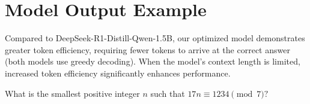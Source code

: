 \section{Model Output Example}
\label{appendix:model_output_example}

Compared to DeepSeek-R1-Distill-Qwen-1.5B, our optimized model demonstrates greater token efficiency, requiring fewer tokens to arrive at the correct answer (both models use greedy decoding). When the model's context length is limited, increased token efficiency significantly enhances performance.

\begin{tcolorbox}[modelbox, title=Problem]
What is the smallest positive integer $n$ such that $17n \equiv 1234 \pmod{7}?$
\end{tcolorbox}

